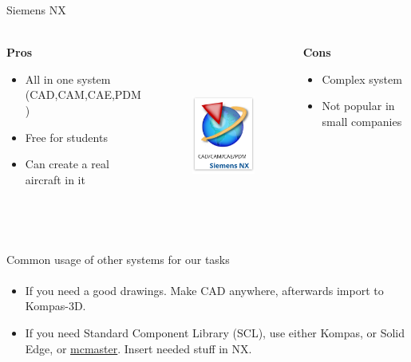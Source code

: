 \documentclass[aspectratio=169]{beamer}
\begin{document}
    \begin{frame}[t]{Siemens NX}
    \framesubtitle{}
        \begin{columns}[T,onlytextwidth]
            \begin{column}{0.32\textwidth}
                \centering\textbf{Pros}
                \begin{itemize}
                    \item All in one system (CAD,CAM,CAE,PDM)
                    \item Free for students
                    \item Can create a real aircraft in it
                \end{itemize}
            \end{column}
            \begin{column}{0.32\textwidth}
                \begin{figure}[H]
                    \centering\includegraphics[height=6cm,width=1\textwidth,keepaspectratio]{resources/NXpic.png}
                    \label{fig:resources/NXpic.png}
                \end{figure}
            \end{column}
            \begin{column}{0.32\textwidth}
                \centering\textbf{Cons}
                \begin{itemize}
                    \item Complex system
                    \item Not popular in small companies
                \end{itemize}
            \end{column}
        \end{columns}
    \end{frame}
    
    \begin{frame}[t]{Common usage of other systems for our tasks}
    \framesubtitle{}
        \begin{itemize}
            \item If you need a good drawings. Make CAD anywhere, afterwards import to Kompas-3D.
            \item If you need Standard Component Library (SCL), use either Kompas, or Solid Edge, or \href{https://www.mcmaster.com/}{mcmaster}. Insert needed stuff in NX.
        \end{itemize}
    \end{frame}
\end{document}
